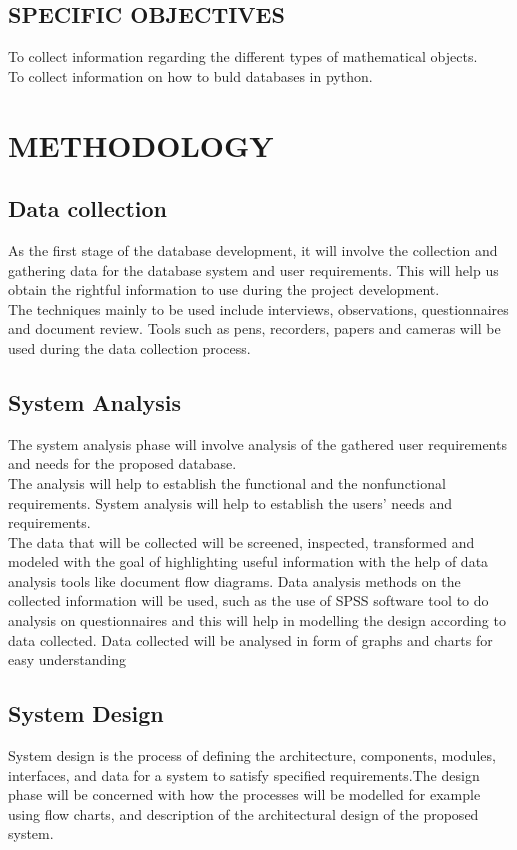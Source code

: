 \documentclass[11pt]{article} %
\begin{document}
\subsection{SPECIFIC OBJECTIVES}
To collect information regarding the different types of mathematical objects.\\
To collect information on how to buld databases in python.\\

\section{METHODOLOGY}

\subsection{Data collection}
As the first stage of the database development, it will involve the collection and gathering data for the  database system and user requirements. This will help us obtain the rightful information to use during the project development.\\ The techniques mainly to be used include interviews, observations, questionnaires and document review. Tools such as pens, recorders, papers and cameras will be used during the data collection process.\\
\subsection{System Analysis}

The system analysis phase will involve analysis of the gathered user requirements and needs for the proposed  database.\\ The analysis will help to establish the functional and the nonfunctional requirements. System analysis will help to establish the users’ needs and requirements.\\The data that will be collected will be screened, inspected, transformed and modeled with the goal of highlighting useful information with the help of data analysis tools like document flow diagrams. Data analysis methods on the collected information will be used, such as the use of SPSS software tool to do analysis on questionnaires and this will help in modelling the design according to data collected. Data collected will be analysed in form of graphs and charts for easy understanding 

\subsection{System Design}
System design is the process of defining the architecture, components, modules, interfaces, and data for a system to satisfy specified requirements.The design phase will be concerned with how the processes will be modelled for example using flow charts, and description of the architectural design of the proposed system.
\end{document}
